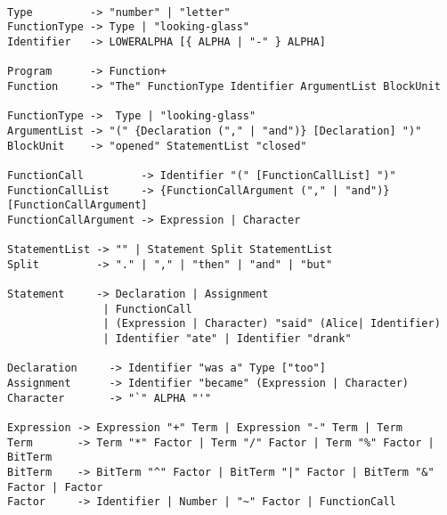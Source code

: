 \documentclass[a4wide, 11pt]{article}
\begin{document}
\begin{verbatim}

Type         -> "number" | "letter"
FunctionType -> Type | "looking-glass"
Identifier   -> LOWERALPHA [{ ALPHA | "-" } ALPHA]

Program      -> Function+
Function     -> "The" FunctionType Identifier ArgumentList BlockUnit

FunctionType ->  Type | "looking-glass"
ArgumentList -> "(" {Declaration ("," | "and")} [Declaration] ")"
BlockUnit    -> "opened" StatementList "closed"

FunctionCall         -> Identifier "(" [FunctionCallList] ")"
FunctionCallList     -> {FunctionCallArgument ("," | "and")} [FunctionCallArgument]
FunctionCallArgument -> Expression | Character

StatementList -> "" | Statement Split StatementList
Split         -> "." | "," | "then" | "and" | "but"

Statement     -> Declaration | Assignment
               | FunctionCall
               | (Expression | Character) "said" (Alice| Identifier)
               | Identifier "ate" | Identifier "drank"
               
Declaration     -> Identifier "was a" Type ["too"]
Assignment      -> Identifier "became" (Expression | Character)
Character       -> "`" ALPHA "'"

Expression -> Expression "+" Term | Expression "-" Term | Term
Term       -> Term "*" Factor | Term "/" Factor | Term "%" Factor | BitTerm
BitTerm    -> BitTerm "^" Factor | BitTerm "|" Factor | BitTerm "&" Factor | Factor
Factor     -> Identifier | Number | "~" Factor | FunctionCall

\end{verbatim}
\end{document}
